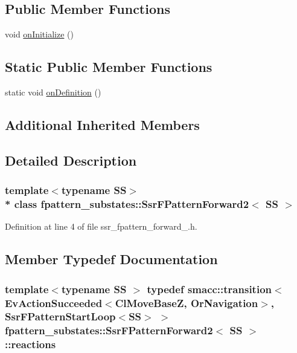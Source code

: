 \subsection*{Public Member Functions}
\begin{DoxyCompactItemize}
\item 
void \hyperlink{structfpattern__substates_1_1SsrFPatternForward2_ae080c618338c88608c0a1df24c78440e}{on\+Initialize} ()
\end{DoxyCompactItemize}
\subsection*{Static Public Member Functions}
\begin{DoxyCompactItemize}
\item 
static void \hyperlink{structfpattern__substates_1_1SsrFPatternForward2_af8fcbd64172279321e512bc35ff1ac4d}{on\+Definition} ()
\end{DoxyCompactItemize}
\subsection*{Additional Inherited Members}


\subsection{Detailed Description}
\subsubsection*{template$<$typename SS$>$\\*
class fpattern\+\_\+substates\+::\+Ssr\+F\+Pattern\+Forward2$<$ S\+S $>$}



Definition at line 4 of file ssr\+\_\+fpattern\+\_\+forward\+\_.\+h.



\subsection{Member Typedef Documentation}
\subsubsection[{\texorpdfstring{reactions}{reactions}}]{\setlength{\rightskip}{0pt plus 5cm}template$<$typename SS $>$ typedef {\bf smacc\+::transition}$<$Ev\+Action\+Succeeded$<$Cl\+Move\+BaseZ, Or\+Navigation$>$, {\bf Ssr\+F\+Pattern\+Start\+Loop}$<$SS$>$ $>$ {\bf fpattern\+\_\+substates\+::\+Ssr\+F\+Pattern\+Forward2}$<$ SS $>$\+::{\bf reactions}}\hypertarget{structfpattern__substates_1_1SsrFPatternForward2_afc4663e9f3257bf96a2700736e4d74c8}{}\label{structfpattern__substates_1_1SsrFPatternForward2_afc4663e9f3257bf96a2700736e4d74c8}


